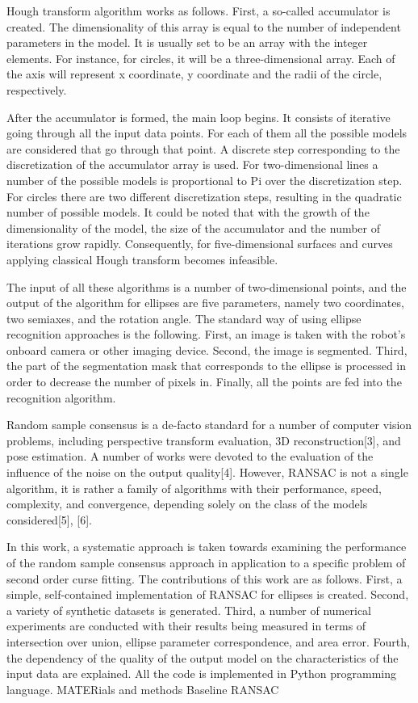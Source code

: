 Hough transform algorithm works as follows. First, a so-called accumulator is created. The dimensionality of this array is equal to the number of independent parameters in the model. It is usually set to be an array with the integer elements. For instance, for circles, it will be a three-dimensional array. Each of the axis will represent x coordinate, y coordinate and the radii of the circle, respectively.

After the accumulator is formed, the main loop begins. It consists of iterative going through all the input data points. For each of them all the possible models are considered that go through that point. A discrete step corresponding to the discretization of the accumulator array is used. For two-dimensional lines a number of the possible models is proportional to Pi over the discretization step. For circles there are two different discretization steps, resulting in the quadratic number of possible models. It could be noted that with the growth of the dimensionality of the model, the size of the accumulator and the number of iterations grow rapidly. Consequently, for five-dimensional surfaces and curves applying classical Hough transform becomes infeasible.

The input of all these algorithms is a number of two-dimensional points, and the output of the algorithm for ellipses are five parameters, namely two coordinates, two semiaxes, and the rotation angle. The standard way of using ellipse recognition approaches is the following. First, an image is taken with the robot’s onboard camera or other imaging device. Second, the image is segmented. Third, the part of the segmentation mask that corresponds to the ellipse is processed in order to decrease the number of pixels in. Finally, all the points are fed into the recognition algorithm.

Random sample consensus is a de-facto standard for a number of computer vision problems, including perspective transform evaluation, 3D reconstruction[3], and pose estimation. A number of works were devoted to the evaluation of the influence of the noise on the output quality[4]. However, RANSAC is not a single algorithm, it is rather a family of algorithms with their performance, speed, complexity, and convergence, depending solely on the class of the models considered[5], [6].

In this work, a systematic approach is taken towards examining the performance of the random sample consensus approach in application to a specific problem of second order curse fitting. The contributions of this work are as follows. First, a simple, self-contained implementation of RANSAC for ellipses is created. Second, a variety of synthetic datasets is generated. Third, a number of numerical experiments are conducted with their results being measured in terms of intersection over union, ellipse parameter correspondence, and area error. Fourth, the dependency of the quality of the output model on the characteristics of the input data are explained. All the code is implemented in Python programming language.
MATERials and methods
Baseline RANSAC

